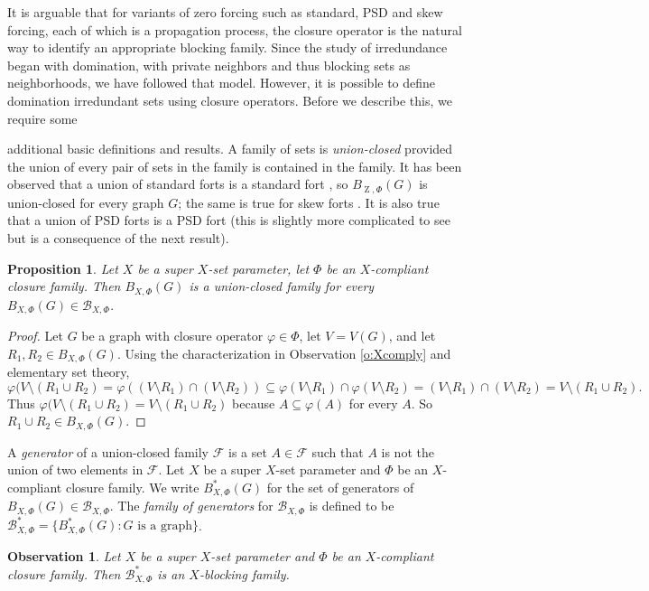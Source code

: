 \documentclass{article}
\numberwithin{figure}{section}
\numberwithin{table}{section}
\numberwithin{equation}{section}
\newtheorem{prop}[thm]{Proposition}
\newtheorem{obs}[thm]{Observation}
\theoremstyle{definition}
\theoremstyle{definition}
\theoremstyle{definition}
\newcommand{\B}{\mathcal{B}}
\newcommand{\Z}{\operatorname{Z}}
\begin{document}
 It is arguable that for variants of zero forcing such as standard, PSD and skew forcing,  each of which is a propagation process, the closure operator is the  natural way to identify an appropriate blocking family.  Since the study of irredundance began  with domination, with private neighbors and thus blocking sets as neighborhoods,  we have followed that model. However, it is possible to define domination irredundant sets using closure operators.
Before we describe this, we require some { additional basic definitions and results. A family of sets is \emph{union-closed} provided the union of every pair of sets in the family is contained in the family.   It has been observed that a union of standard forts is a standard fort \cite{ZIR}, so  $B_{\Z,\Phi}(G)$  is union-closed  for every graph $G$; the same is true for skew forts \cite{skewTErecon}.  It is also true that a union of PSD forts is a PSD fort (this is slightly more complicated to see but is a consequence of the next result). 


\begin{prop}\label{prop: blocking union closed}
Let $X$ be a super $X$-set parameter, let $\Phi$ be an $X$-compliant closure family. Then $B_{X,\Phi}(G)$ is a union-closed family for every $B_{X,\Phi}(G) \in \B_{X,\Phi}$.
\end{prop}
\begin{proof}
Let $G$ be a graph with closure operator $\varphi\in \Phi$, let $V=V(G)$, and let $R_1,R_2\in B_{X,\Phi}(G)$. Using the characterization in Observation \ref{o:Xcomply} and elementary set theory, 
\[\varphi(V\setminus (R_1\cup R_2)=\varphi((V\setminus R_1) \cap (V\setminus R_2))\subseteq \varphi(V\setminus R_1) \cap \varphi(V\setminus R_2)=(V\setminus R_1) \cap (V\setminus R_2)=V\setminus(R_1\cup R_2).\]
Thus $\varphi(V\setminus (R_1\cup R_2)=V\setminus(R_1\cup R_2)$ because  $A\subseteq \varphi(A)$ for every $A$.  So $R_1\cup R_2\in B_{X,\Phi}(G)$.
\end{proof}

A \emph{generator} of a union-closed family $\mathcal{F}$ is a set $A\in\mathcal{F}$ such that $A$ is not the union of two elements in $\mathcal{F}$.  Let $X$ be a super $X$-set parameter and $\Phi$ be an $X$-compliant closure family. We write $B_{X,\Phi}^*(G)$ for the set of generators of $B_{X,\Phi}(G)\in \B_{X,\Phi}$. The \emph{family of generators} for $\B_{X,\Phi}$ is defined to be $\B_{X,\Phi}^* = \{B_{X,\Phi}^*(G) : G \text{ is a graph}\}$.



\begin{obs} 
Let $X$ be a super $X$-set parameter and $\Phi$ be an $X$-compliant closure family. Then $\B_{X,\Phi}^*$ is an $X$-blocking family.
\end{obs}




}
\end{document}
